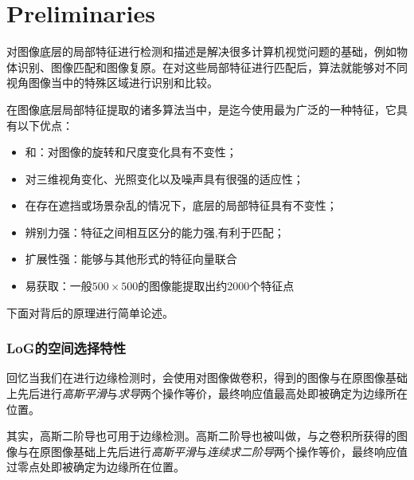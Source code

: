 \part{Preliminaries}\label{part:Introduction}

对图像底层的局部特征进行检测和描述是解决很多计算机视觉问题的基础，例如物体识别、图像匹配和图像复原。在对这些局部特征进行匹配后，算法就能够对不同视角图像当中的特殊区域进行识别和比较。

在图像底层局部特征提取的诸多算法当中，\sift 是迄今使用最为广泛的一种特征，它具有以下优点：
\begin{itemize}
	\item \rinvariance 和\sinvariance ：对图像的旋转和尺度变化具有不变性；
	\item 对三维视角变化、光照变化以及噪声具有很强的适应性；
	\item 在存在遮挡或场景杂乱的情况下，底层的局部特征具有不变性；
	\item 辨别力强：特征之间相互区分的能力强,有利于匹配；
	\item 扩展性强：能够与其他形式的特征向量联合
	\item 易获取：一般$500\times 500$的图像能提取出约2000个特征点
\end{itemize}

下面对\sift 背后的原理进行简单论述。

\section{LoG的空间选择特性}

回忆当我们在进行边缘检测时，会使用\gspd 对图像做卷积，得到的图像与在原图像基础上先后进行\emph{高斯平滑}与\emph{求导}两个操作等价，最终响应值最高处即被确定为边缘所在位置。

其实，高斯二阶导也可用于边缘检测。高斯二阶导也被叫做\lpl ，与之卷积所获得的图像与在原图像基础上先后进行\emph{高斯平滑}与\emph{连续求二阶导}两个操作等价，最终响应值过零点处即被确定为边缘所在位置。


